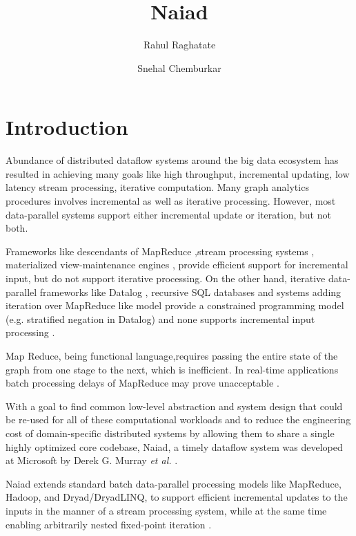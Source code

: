 \documentclass[9pt,twocolumn,twoside]{../../styles/osajnl}
\title{Naiad}
\author[1,*]{Rahul Raghatate}
\author[1]{Snehal Chemburkar}
\affil[1]{School of Informatics and Computing, Bloomington, IN 47408,
  U.S.A.}
\affil[*]{Corresponding authors: rragahta@iu.edu, snehchem@iu.edu }
\begin{document}
\maketitle

\section{Introduction}

Abundance of distributed dataflow systems around the big data
ecosystem has resulted in achieving many goals like high throughput,
incremental updating, low latency stream processing, iterative
computation. Many graph analytics procedures involves incremental as
well as iterative processing. However, most data-parallel systems
support either incremental update or iteration, but not both.

Frameworks like descendants of MapReduce
\cite{paper-incoop,paper-nectar},stream processing systems
\cite{eventstream,paper-spade}, materialized view-maintenance engines
\cite{paper-maintainance}, provide efficient support for incremental
input, but do not support iterative processing. On the other hand,
iterative data-parallel frameworks like Datalog \cite{paper-datalog},
recursive SQL databases \cite{paper-SQL} and systems adding iteration
over MapReduce like model
\cite{paper-haloop,paper-twister,paper-ceil,paper-RDD} provide a
constrained programming model (e.g. stratified negation in Datalog)
and none supports incremental input processing \cite{paper2-Naiad}.

Map Reduce, being functional language,requires passing the entire
state of the graph from one stage to the next, which is
inefficient. In real-time applications batch processing delays of
MapReduce may prove unacceptable
\cite{www-informationage-blog-wordpress-naiad}.

With a goal to find common low-level abstraction and system design
that could be re-used for all of these computational workloads and to
reduce the engineering cost of domain-specific distributed systems by
allowing them to share a single highly optimized core codebase, Naiad,
a timely dataflow system was developed at Microsoft by Derek G. Murray
\textit{et al.} \cite{paper3-Naiad}.

Naiad extends standard batch data-parallel processing models like
MapReduce, Hadoop, and Dryad/DryadLINQ, to support efficient
incremental updates to the inputs in the manner of a stream processing
system, while at the same time enabling arbitrarily nested fixed-point
iteration \cite{paper1-Naiad}.
\end{document}

